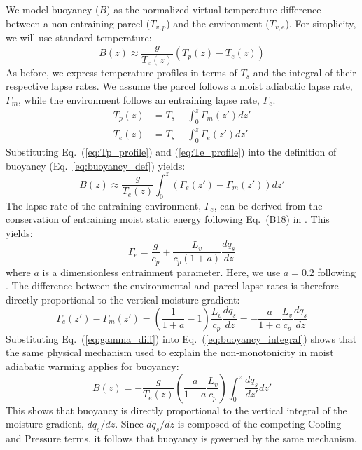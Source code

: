 \documentclass[draft]{ametsocV6.1}
\begin{document}
We model buoyancy ($B$) as the normalized virtual temperature difference between a non-entraining parcel ($T_{v,p}$) and the environment ($T_{v,e}$). For simplicity, we will use standard temperature:
\begin{equation}
B(z)\approx\frac{g}{T_e(z)}(T_p(z)-T_e(z)) \label{eq:buoyancy_def}
\end{equation}
As before, we express temperature profiles in terms of $T_s$ and the integral of their respective lapse rates. We assume the parcel follows a moist adiabatic lapse rate, $\Gamma_m$, while the environment follows an entraining lapse rate, $\Gamma_e$.
\begin{align}
T_p(z)&=T_s-\int_0^z \Gamma_m(z')dz' \label{eq:Tp_profile} \\
T_e(z)&=T_s-\int_0^z \Gamma_e(z')dz' \label{eq:Te_profile}
\end{align}
Substituting Eq.~(\ref{eq:Tp_profile}) and (\ref{eq:Te_profile}) into the definition of buoyancy (Eq.~\ref{eq:buoyancy_def}) yields:
\begin{equation}
B(z)\approx\frac{g}{T_e(z)}\int_0^z(\Gamma_e(z')-\Gamma_m(z'))dz' \label{eq:buoyancy_integral}
\end{equation}
The lapse rate of the entraining environment, $\Gamma_e$, can be derived from the conservation of entraining moist static energy following Eq.~(B18) in \cite{romps2016}. This yields:
\begin{equation}
\Gamma_e = \frac{g}{c_p} + \frac{L_v}{c_p(1+a)}\frac{dq_s}{dz} \label{eq:gamma_e}
\end{equation}
where $a$ is a dimensionless entrainment parameter. Here, we use $a=0.2$ following \cite{romps2016}. The difference between the environmental and parcel lapse rates is therefore directly proportional to the vertical moisture gradient:
\begin{equation}
\Gamma_e(z')-\Gamma_m(z')=\left(\frac{1}{1+a}-1\right)\frac{L_v}{c_p}\frac{dq_s}{dz}=-\frac{a}{1+a}\frac{L_v}{c_p}\frac{dq_s}{dz} \label{eq:gamma_diff}
\end{equation}
Substituting Eq.~(\ref{eq:gamma_diff}) into Eq.~(\ref{eq:buoyancy_integral}) shows that the same physical mechanism used to explain the non-monotonicity in moist adiabatic warming applies for buoyancy:
\begin{equation}
B(z)=-\frac{g}{T_e(z)}\left(\frac{a}{1+a}\frac{L_v}{c_p}\right)\int_0^z\frac{dq_s}{dz'}dz' \label{eq:buoyancy_final}
\end{equation}
This shows that buoyancy is directly proportional to the vertical integral of the moisture gradient, $dq_s/dz$. Since $dq_s/dz$ is composed of the competing Cooling and Pressure terms, it follows that buoyancy is governed by the same mechanism.
\end{document}
